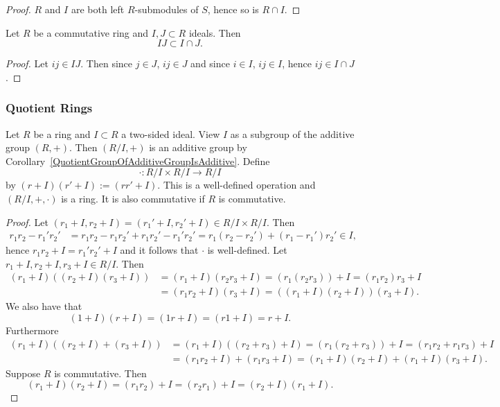 \begin{proof}
    $R$ and $I$ are both left $R$-submodules of $S$, hence so is $R\cap I$.
\end{proof}
\begin{lemma}\label{IntersectionAndProductOfIdeals}
    Let $R$ be a commutative ring and $I,J\subset R$ ideals. Then 
    $$IJ\subset I\cap J.$$
\end{lemma}
\begin{proof}
    Let $ij\in IJ$. Then since $j\in J$, $ij\in J$ and since $i\in I$, $ij\in I$, hence $ij\in I\cap J$. 
\end{proof}
\subsubsection{Quotient Rings}
    \begin{proposition}\label{QuotientRingIsRing}
    Let $R$ be a ring and $I\subset R$ a two-sided ideal. View $I$ as a subgroup of the additive group $(R,+)$. Then $(R/I,+)$ is an additive group by Corollary~\ref{QuotientGroupOfAdditiveGroupIsAdditive}. Define 
    $$\cdot : R/I\times R/I \rightarrow R/I$$
    by $(r+I)(r'+I):= (rr'+I)$. This is a well-defined operation and $(R/I, +,\cdot)$ is a ring. It is also commutative if $R$ is commutative.
\end{proposition}
\begin{proof}
    Let $(r_1+I,r_2+I) = (r_1'+I,r_2'+I)\in R/I\times R/I$. Then 
    \begin{align*}
        r_1r_2 - r_1'r_2' &= r_1r_2 - r_1r_2'+r_1r_2' - r_1'r_2' = r_1(r_2-r_2') + (r_1-r_1')r_2' \in I, 
    \end{align*}
    hence $r_1r_2 +I = r_1'r_2' + I $ and it follows that $\cdot$ is well-defined. 
    Let $r_1+I,r_2+I,r_3+I\in R/I$. Then 
    \begin{align*}
        (r_1+I)((r_2+I)(r_3+I)) &=(r_1+I)(r_2r_3+I) = (r_1(r_2r_3))+ I = (r_1r_2)r_3 + I\\ &= (r_1r_2+I)(r_3+I)= ((r_1+I)(r_2+I))(r_3+I).
    \end{align*}
    We also have that 
    $$(1+I)(r+I) = (1r+I) = (r1+I) = r+I.$$
    Furthermore 
    \begin{align*}
        (r_1+I)((r_2+I)+(r_3+I)) &= (r_1+I)((r_2+r_3)+I)=(r_1(r_2+r_3))+I = (r_1r_2+r_1r_3)+I\\ &= (r_1r_2+I) + (r_1r_3+I) = (r_1+I)(r_2+I)+(r_1+I)(r_3+I).
    \end{align*}
    Suppose $R$ is commutative. Then 
    $$(r_1+I)(r_2+I) = (r_1r_2)+I  = (r_2r_1)+I = (r_2+I)(r_1+I).$$
\end{proof}
